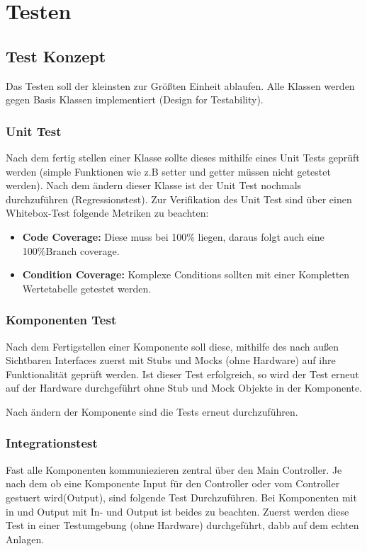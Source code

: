 \chapter{Testen}

\section{Test Konzept}
Das Testen soll der kleinsten zur Größten Einheit ablaufen.
Alle Klassen werden gegen Basis Klassen implementiert (Design for Testability).

\subsection{Unit Test}
Nach dem fertig stellen einer Klasse sollte dieses mithilfe eines Unit Tests geprüft werden (simple Funktionen wie z.B setter und getter müssen nicht getestet werden).
Nach dem ändern dieser Klasse ist der Unit Test nochmals durchzuführen (Regressionstest).
Zur Verifikation des Unit Test sind über einen Whitebox-Test folgende Metriken zu beachten:
\begin{itemize} 
	\item \textbf{Code Coverage:} Diese muss bei 100\% liegen, daraus folgt auch eine 100\%Branch coverage.
	\item\textbf{Condition Coverage:} Komplexe Conditions sollten mit einer Kompletten Wertetabelle getestet werden.
\end{itemize}

\subsection{Komponenten Test}
Nach dem Fertigstellen einer Komponente soll diese, mithilfe des nach außen Sichtbaren Interfaces zuerst mit Stubs und Mocks (ohne Hardware) auf ihre Funktionalität geprüft werden.
Ist dieser Test erfolgreich, so wird der Test erneut auf der Hardware durchgeführt ohne Stub und Mock Objekte in der Komponente. 

Nach ändern der Komponente sind die Tests erneut durchzuführen.

\subsection{Integrationstest}
Fast alle Komponenten kommuniezieren zentral über den Main Controller.
Je nach dem ob eine Komponente Input für den Controller oder vom Controller gestuert wird(Output), sind folgende Test Durchzuführen.
Bei Komponenten mit in und Output mit In- und Output ist beides zu beachten. Zuerst werden diese Test in einer Testumgebung (ohne Hardware) durchgeführt, 
dabb auf dem echten Anlagen.

